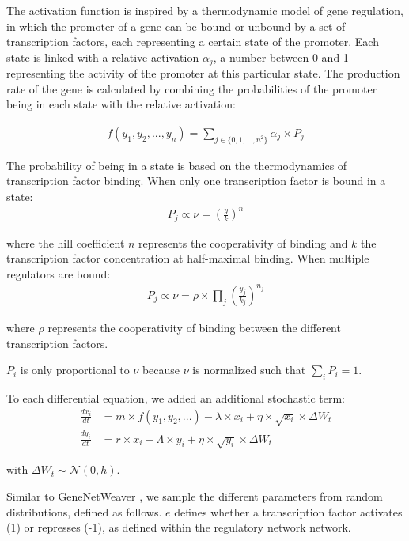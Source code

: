The activation function is inspired by a thermodynamic model of gene regulation, in which the promoter of a gene can be bound or unbound by a set of transcription factors, each representing a certain state of the promoter. Each state is linked with a relative activation $\alpha_j$, a number between 0 and 1 representing the activity of the promoter at this particular state. The production rate of the gene is calculated by combining the probabilities of the promoter being in each state with the relative activation:

$$
\begin{aligned}
\label{eq:input_function_probabilities}
f(y_1, y_2, ..., y_n) = \sum_{j \in \{0, 1, ..., n^2\}} \alpha_j \times P_j
\end{aligned}
$$

The probability of being in a state is based on the thermodynamics of transcription factor binding. When only one transcription factor is bound in a state:
$$
\begin{aligned}
P_j \propto \nu = \left(\frac{y}{k}\right)^{n}
\end{aligned}
$$

where the hill coefficient $n$ represents the cooperativity of binding and $k$ the transcription factor concentration at half-maximal binding. When multiple regulators are bound:
$$
\begin{aligned}
P_j \propto \nu =  \rho \times \prod_j \left(\frac{y_j}{k_j}\right)^{n_j}
\end{aligned}
$$

where $\rho$ represents the cooperativity of binding between the different transcription factors. 

$P_i$ is only proportional to $\nu$ because $\nu$ is normalized such that $\sum_{i} P_i = 1$.

To each differential equation, we added an additional stochastic term: 
$$
\begin{aligned}
\frac{dx_i}{dt} & = m \times f(y_1, y_2, ...) - \lambda \times x_i + \eta \times \sqrt{x_i} \times \Delta W_t \\
\frac{dy_i}{dt} & = r \times x_i - \Lambda \times y_i + \eta \times \sqrt{y_i} \times \Delta W_t
\end{aligned}
$$

with $\Delta W_t \sim \mathcal{N}(0, h)$. 

Similar to GeneNetWeaver \cite{schaffter_genenetweaversilicobenchmark_2011}, we sample the different parameters from random distributions, defined as follows. $e$ defines whether a transcription factor activates (1) or represses (-1), as defined within the regulatory network network.

